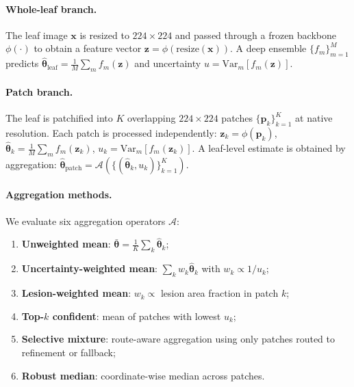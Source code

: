 \documentclass[11pt]{article}
\begin{document}
\paragraph{Whole-leaf branch.}
The leaf image $\mathbf{x}$ is resized to $224{\times}224$ and passed through a frozen backbone $\phi(\cdot)$ to obtain a feature vector $\mathbf{z} = \phi(\mathrm{resize}(\mathbf{x}))$.  A deep ensemble $\{f_m\}_{m=1}^M$ predicts $\hat{\boldsymbol{\theta}}_{\mathrm{leaf}} = \frac{1}{M}\sum_m f_m(\mathbf{z})$ and uncertainty $u = \mathrm{Var}_m[f_m(\mathbf{z})]$.

\paragraph{Patch branch.}
The leaf is patchified into $K$ overlapping $224{\times}224$ patches $\{\mathbf{p}_k\}_{k=1}^K$ at native resolution.  Each patch is processed independently: $\mathbf{z}_k = \phi(\mathbf{p}_k)$, $\hat{\boldsymbol{\theta}}_k = \frac{1}{M}\sum_m f_m(\mathbf{z}_k)$, $u_k = \mathrm{Var}_m[f_m(\mathbf{z}_k)]$.  A leaf-level estimate is obtained by aggregation: $\hat{\boldsymbol{\theta}}_{\mathrm{patch}} = \mathcal{A}(\{(\hat{\boldsymbol{\theta}}_k, u_k)\}_{k=1}^K)$.

\paragraph{Aggregation methods.}
We evaluate six aggregation operators $\mathcal{A}$:
\begin{enumerate}[leftmargin=1.5em,itemsep=1pt]
\item \textbf{Unweighted mean}: $\bar{\boldsymbol{\theta}} = \frac{1}{K}\sum_k \hat{\boldsymbol{\theta}}_k$;
\item \textbf{Uncertainty-weighted mean}: $\sum_k w_k \hat{\boldsymbol{\theta}}_k$ with $w_k \propto 1/u_k$;
\item \textbf{Lesion-weighted mean}: $w_k \propto$ lesion area fraction in patch $k$;
\item \textbf{Top-$k$ confident}: mean of patches with lowest $u_k$;
\item \textbf{Selective mixture}: route-aware aggregation using only patches routed to refinement or fallback;
\item \textbf{Robust median}: coordinate-wise median across patches.
\end{enumerate}
\end{document}
